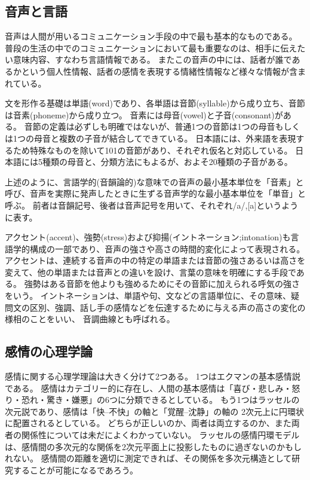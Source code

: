 \subsection{音声と言語\cite{furui1985digital}}
\label{sec:Speech}
音声は人間が用いるコミュニケーション手段の中で最も基本的なものである。
普段の生活の中でのコミュニケーションにおいて最も重要なのは、相手に伝えたい意味内容、すなわち言語情報である。
またこの音声の中には、話者が誰であるかという個人性情報、話者の感情を表現する情緒性情報など様々な情報が含まれている。
\par
文を形作る基礎は単語(word)であり、各単語は音節(syllable)から成り立ち、音節は音素(phoneme)から成り立つ。
音素には母音(vowel)と子音(consonant)がある。
音節の定義は必ずしも明確ではないが、普通1つの音節は1つの母音もしくは1つの母音と複数の子音が結合してできている。
日本語には、外来語を表現するため特殊なものを除いて101の音節があり、それぞれ仮名と対応している。
日本語には5種類の母音と、分類方法にもよるが、およそ20種類の子音がある。
\par
上述のように、言語学的(音韻論的)な意味での音声の最小基本単位を「音素」と呼び、音声を実際に発声したときに生ずる音声学的な最小基本単位を「単音」と呼ぶ。
前者は音韻記号、後者は音声記号を用いて、それぞれ/a/,[a]というように表す。
\par
アクセント(accent)、強勢(stress)および抑揚(イントネーション;intonation)も言語学的構成の一部であり、音声の強さや高さの時間的変化によって表現される。
アクセントは、連続する音声の中の特定の単語または音節の強さあるいは高さを変えて、他の単語または音声との違いを設け、言葉の意味を明確にする手段である。
強勢はある音節を他よりも強めるためにその音節に加えられる呼気の強さをいう。
イントネーションは、単語や句、文などの言語単位に、その意味、疑問文の区別、強調、話し手の感情などを伝達するために与える声の高さの変化の様相のことをいい、
音調曲線とも呼ばれる。



\subsection{感情の心理学論}
\label{sec:PsychoEmo}
感情に関する心理学理論は大きく分けて2つある。
1つはエクマンの基本感情説\cite{ekman1992argument}である。
感情はカテゴリー的に存在し、人間の基本感情は「喜び・悲しみ・怒り・恐れ・驚き・嫌悪」の6つに分類できるとしている。
もう1つはラッセルの次元説\cite{russell1980circumplex}であり、感情は「快--不快」の軸と「覚醒--沈静」の軸の
2次元上に円環状に配置されるとしている。
どちらが正しいのか、両者は両立するのか、また両者の関係性については未だによくわかっていない。
ラッセルの感情円環モデルは、感情間の多次元的な関係を2次元平面上に投影したものに過ぎないのかもしれない。
感情間の距離を適切に測定できれば、その関係を多次元構造として研究することが可能になるであろう。


